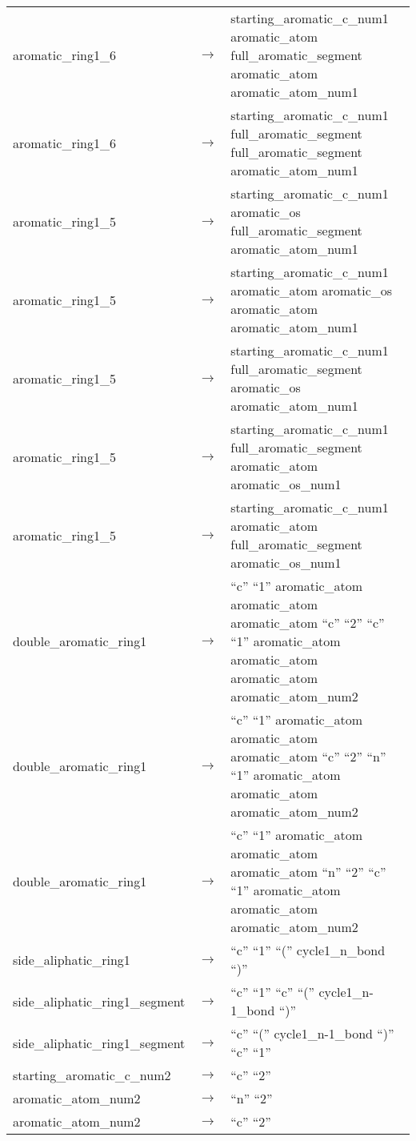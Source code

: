 \documentclass[../Document.tex]{subfiles}
\begin{document}
\begin{longtable}{m{} p{} p{}}
    aromatic\_ring1\_6 & $\rightarrow$ & starting\_aromatic\_c\_num1 aromatic\_atom full\_aromatic\_segment aromatic\_atom aromatic\_atom\_num1 \\
    aromatic\_ring1\_6 & $\rightarrow$ & starting\_aromatic\_c\_num1 full\_aromatic\_segment full\_aromatic\_segment aromatic\_atom\_num1 \\
    aromatic\_ring1\_5 & $\rightarrow$ & starting\_aromatic\_c\_num1 aromatic\_os full\_aromatic\_segment aromatic\_atom\_num1 \\
    aromatic\_ring1\_5 & $\rightarrow$ & starting\_aromatic\_c\_num1 aromatic\_atom aromatic\_os aromatic\_atom aromatic\_atom\_num1 \\
    aromatic\_ring1\_5 & $\rightarrow$ & starting\_aromatic\_c\_num1 full\_aromatic\_segment aromatic\_os aromatic\_atom\_num1 \\
    aromatic\_ring1\_5 & $\rightarrow$ & starting\_aromatic\_c\_num1 full\_aromatic\_segment aromatic\_atom aromatic\_os\_num1 \\
    aromatic\_ring1\_5 & $\rightarrow$ & starting\_aromatic\_c\_num1 aromatic\_atom full\_aromatic\_segment aromatic\_os\_num1 \\
    double\_aromatic\_ring1 & $\rightarrow$ & ``c'' ``1'' aromatic\_atom aromatic\_atom aromatic\_atom ``c'' ``2'' ``c'' ``1'' aromatic\_atom aromatic\_atom aromatic\_atom aromatic\_atom\_num2 \\
    double\_aromatic\_ring1 & $\rightarrow$ & ``c'' ``1'' aromatic\_atom aromatic\_atom aromatic\_atom ``c'' ``2'' ``n'' ``1'' aromatic\_atom aromatic\_atom aromatic\_atom\_num2 \\
    double\_aromatic\_ring1 & $\rightarrow$ & ``c'' ``1'' aromatic\_atom aromatic\_atom aromatic\_atom ``n'' ``2'' ``c'' ``1'' aromatic\_atom aromatic\_atom aromatic\_atom\_num2 \\
    side\_aliphatic\_ring1 & $\rightarrow$ & ``c'' ``1'' ``('' cycle1\_n\_bond ``)'' \\
    side\_aliphatic\_ring1\_segment & $\rightarrow$ & ``c'' ``1'' ``c'' ``('' cycle1\_n-1\_bond ``)'' \\
    side\_aliphatic\_ring1\_segment & $\rightarrow$ & ``c'' ``('' cycle1\_n-1\_bond ``)'' ``c'' ``1'' \\
    starting\_aromatic\_c\_num2 & $\rightarrow$ & ``c'' ``2'' \\
    aromatic\_atom\_num2 & $\rightarrow$ & ``n'' ``2'' \\
    aromatic\_atom\_num2 & $\rightarrow$ & ``c'' ``2'' \\

\end{longtable}
\end{document}
